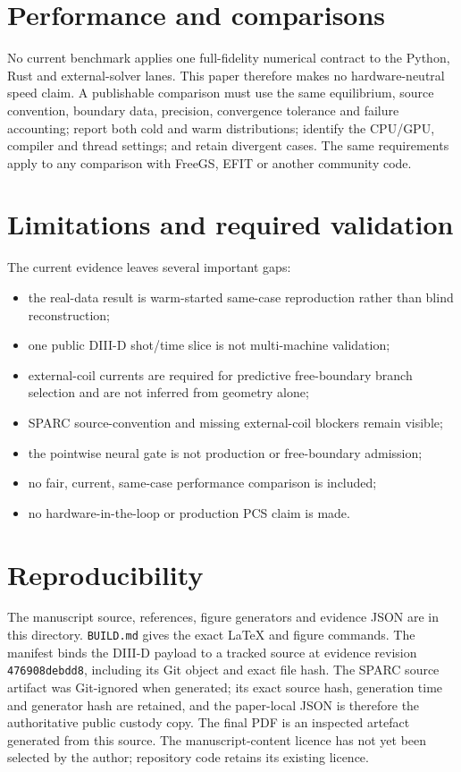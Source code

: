 \documentclass[11pt]{article}
\newcommand{\code}[1]{\texttt{#1}}
\begin{document}
\section{Performance and comparisons}

No current benchmark applies one full-fidelity numerical contract to the Python,
Rust and external-solver lanes.  This paper therefore makes no hardware-neutral
speed claim.  A publishable comparison must use the same equilibrium, source convention,
boundary data, precision, convergence tolerance and failure accounting; report
both cold and warm distributions; identify the CPU/GPU, compiler and thread
settings; and retain divergent cases.  The same requirements apply to any
comparison with FreeGS, EFIT or another community code.

\section{Limitations and required validation}

The current evidence leaves several important gaps:
\begin{itemize}
  \item the real-data result is warm-started same-case reproduction rather than
        blind reconstruction;
  \item one public DIII-D shot/time slice is not multi-machine validation;
  \item external-coil currents are required for predictive free-boundary branch
        selection and are not inferred from geometry alone;
  \item SPARC source-convention and missing external-coil blockers remain visible;
  \item the pointwise neural gate is not production or free-boundary admission;
  \item no fair, current, same-case performance comparison is included;
  \item no hardware-in-the-loop or production PCS claim is made.
\end{itemize}

\section{Reproducibility}

The manuscript source, references, figure generators and evidence JSON are in
this directory.  \code{BUILD.md} gives the exact LaTeX and figure commands.
The manifest binds the DIII-D payload to a tracked source at evidence revision
\code{476908debdd8}, including its Git object and exact file hash.  The SPARC
source artifact was Git-ignored when generated; its exact source hash,
generation time and generator hash are retained, and the paper-local JSON is
therefore the authoritative public custody copy.  The final PDF is an inspected
artefact generated from this source.  The manuscript-content licence has not
yet been selected by the author; repository code retains its existing licence.
\end{document}
